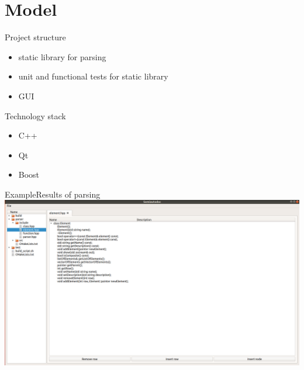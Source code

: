 \documentclass{beamer}
\begin{document}
\section{Model}
\begin{frame}
{Project structure}
\vskip 0.1cm

\begin{itemize}
\item{static library for parsing}
\item{unit and functional tests for static library}
\item{GUI}
\end{itemize}

\end{frame}

\begin{frame}{Technology stack}
\begin{itemize}
\item{C++}
\item{Qt}
\item{Boost}
\end{itemize}
\end{frame}

\begin{frame}
{Example}{Results of parsing}
\includegraphics[scale = 0.28]{semiautodoc-example.png}


\end{frame}
\end{document}
